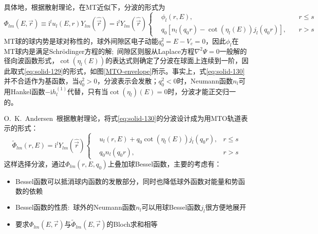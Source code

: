 具体地，根据散射理论，在MT近似下，分波的形式为
\begin{equation}
	\Phi_{lm}(E,\vec r)\equiv \mathrm{i}^lu_l(E,r)Y_{lm}(\hat{\vec r})=\mathrm{i}^lY_{lm}(\hat{\vec r})\left\{
  \begin{aligned}
    &\phi_l(r,E),&r\leqslant s\\
    &q_0[n_l(q_0 r)-\cot(\eta_l(E))j_l(q_0 r)],\quad&r>s
  \end{aligned}\right.
  \label{eq:solid-130}
\end{equation}
MT球的球内势是球对称性的，球外间隙区电子动能$q_0^2=E-V_c=0$，因此$\phi_l$在MT球内是满足Schr\"odinger方程的解;~间隙区则服从Laplace方程$\nabla^2\Psi=0$一般解的径向波函数形式，$\cot(\eta_l(E))$的表达式则确定了分波在球面上连续到一阶，因此取式\eqref{eq:solid-129}的形式，如图\ref{MTO-envelope}所示。事实上，式\eqref{eq:solid-130}并不合适作为基函数，当$q_0^2>0$，分波表示会发散；$q_0^2<0$时，Neumann函数$n_l$可用Hankel函数$-\mathrm{i}h_l^{(1)}$代替，只有当$\cot(\eta_l)(E)=0$时，分波才能正交归一的。

\textrm{O.~K.~Andersen~}根据散射理论，将式\eqref{eq:solid-130}的分波设计成为用\textrm{MTO}轨道表示的形式：
\begin{equation}
	\tilde\Phi_{lm}(r,E)=\mathrm{i}^lY_{lm}(\hat{\vec r})\left\{
  \begin{aligned}
    &u_l(r,E)+q_0\cot(\eta_l(E))j_l(q_0 r),&r\leqslant s\\
    &q_0 n_l(q_0 r),\quad&r>s
  \end{aligned}\right.
  \label{eq:solid-Andersen}
\end{equation}
这样选择分波，通过$\Phi_{lm}(r,E,q_0)$上叠加球Bessel函数，主要的考虑有：
\begin{itemize}
	\item Bessel函数可以抵消球内函数的发散部分，同时也降低球外函数对能量和势函数的依赖
	\item Bessel函数的性质:~球外的Neumann函数$n_l$可以用球Bessel函数$j_l$很方便地展开
	\item 要求$\Phi_{lm}(E,\vec r)$与$\tilde\Phi_{lm}(E,\vec r)$的Bloch求和相等
\end{itemize}

